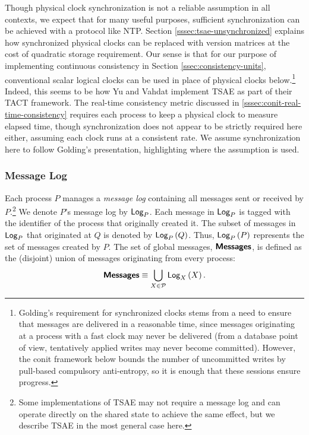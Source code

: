 \documentclass[]             %
{NASA}                       %
\theoremstyle{definition}
\begin{document}
Though physical clock synchronization is not a reliable assumption in
all contexts, we expect that for many useful purposes, sufficient
synchronization can be achieved with a protocol like NTP.  Section
\ref{sssec:tsae-unsynchronized} explains how synchronized physical
clocks can be replaced with version matrices at the cost of quadratic
storage requirement. Our sense is that for our purpose of implementing
continuous consistency in Section \ref{ssec:consistency-units},
conventional scalar logical clocks can be used in place of physical
clocks below.\footnote{Golding's requirement for synchronized clocks
  stems from a need to ensure that messages are delivered in a
  reasonable time, since messages originating at a process with a fast
  clock may never be delivered (from a database point of view,
  tentatively applied writes may never become committed). However, the
  conit framework below bounds the number of uncommitted writes by
  pull-based compulsory anti-entropy, so it is enough that these
  sessions ensure progress.} Indeed, this seems to be how Yu and
Vahdat \cite{2000tact} implement TSAE as part of their TACT
framework. The real-time consistency metric discussed in
\ref{sssec:conit-real-time-consistency} requires each process to keep
a physical clock to measure elapsed time, though synchronization does
not appear to be strictly required here either, assuming each clock
runs at a consistent rate. We assume synchronization here to follow
Golding's presentation, highlighting where the assumption is used.


\subsubsection{Message Log}
\label{sssec:tsae-message-log}

Each process $P$ manages a \emph{message log} containing all messages
sent or received by $P$.\footnote{Some implementations of TSAE may not
  require a message log and can operate directly on the shared state
  to achieve the same effect, but we describe TSAE in the most general
  case here.} We denote $P$'s message log by $\textsf{Log}_{P}$. Each message in
$\textsf{Log}_{P}$ is tagged with the identifier of the process that originally
created it. The subset of messages in $\textsf{Log}_{P}$ that originated at $Q$
is denoted by $\textsf{Log}_{P}\left(Q\right)$. Thus, $\textsf{Log}_{P}\left(P\right)$ represents the set of
messages created by $P$. The set of global messages, $\textbf{\textsf{Messages}}$, is defined
as the (disjoint) union of messages originating from every process:
\[\textbf{\textsf{Messages}} \equiv \bigcup_{X \in \mathcal{P}} \textsf{Log}_{X}\left(X\right).\]
\end{document}
